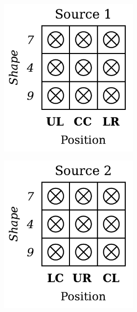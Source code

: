 \begin{definition}
\begin{figure}[H]
\begin{subfigure}[b]{0.45\textwidth}
\begin{subfigure}[b]{0.48\textwidth}
                \includegraphics[width=\textwidth]{img/datasets/ZSO_fact=pos_env=0.pdf}
            \end{subfigure}
            \begin{subfigure}[b]{0.48\textwidth}
                \centering
                \includegraphics[width=\textwidth]{img/datasets/ZSO_fact=pos_env=1.pdf}

\end{subfigure}
\end{subfigure}
\end{figure}
\end{definition}
